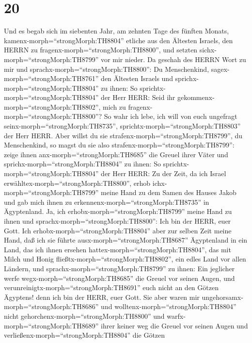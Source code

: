 \hypertarget{section-19}{%
\section{20}\label{section-19}}

 Und es begab sich im siebenten Jahr, am zehnten Tage des
fünften Monats, kamenx-morph=``strongMorph:TH8804'' etliche aus den
Ältesten Israels, den HERRN zu fragenx-morph=``strongMorph:TH8800'', und
setzten sichx-morph=``strongMorph:TH8799'' vor mir nieder. 
Da geschah des HERRN Wort zu mir und
sprachx-morph=``strongMorph:TH8800'':  Du Menschenkind,
sagex-morph=``strongMorph:TH8761'' den Ältesten Israels und
sprichx-morph=``strongMorph:TH8804'' zu ihnen: So
sprichtx-morph=``strongMorph:TH8804'' der Herr HERR: Seid ihr
gekommenx-morph=``strongMorph:TH8802'', mich zu
fragenx-morph=``strongMorph:TH8800''? So wahr ich lebe, ich will von
euch ungefragt seinx-morph=``strongMorph:TH8735'',
sprichtx-morph=``strongMorph:TH8803'' der Herr HERR.  Aber
willst du sie strafenx-morph=``strongMorph:TH8799'', du Menschenkind, so
magst du sie also strafenx-morph=``strongMorph:TH8799'': zeige ihnen
anx-morph=``strongMorph:TH8685'' die Greuel ihrer Väter  und
sprichx-morph=``strongMorph:TH8804'' zu ihnen: So
sprichtx-morph=``strongMorph:TH8804'' der Herr HERR: Zu der Zeit, da ich
Israel erwähltex-morph=``strongMorph:TH8800'', erhob
ichx-morph=``strongMorph:TH8799'' meine Hand zu dem Samen des Hauses
Jakob und gab mich ihnen zu erkennenx-morph=``strongMorph:TH8735'' in
Ägyptenland. Ja, ich erhobx-morph=``strongMorph:TH8799'' meine Hand zu
ihnen und sprachx-morph=``strongMorph:TH8800'': Ich bin der HERR, euer
Gott.  Ich erhobx-morph=``strongMorph:TH8804'' aber zur
selben Zeit meine Hand, daß ich sie führte
ausx-morph=``strongMorph:TH8687'' Ägyptenland in ein Land, das ich ihnen
ersehen hattex-morph=``strongMorph:TH8804'', das mit Milch und Honig
fließtx-morph=``strongMorph:TH8802'', ein edles Land vor allen Ländern,
 und sprachx-morph=``strongMorph:TH8799'' zu ihnen: Ein
jeglicher werfe wegx-morph=``strongMorph:TH8685'' die Greuel vor seinen
Augen, und verunreinigtx-morph=``strongMorph:TH8691'' euch nicht an den
Götzen Ägyptens! denn ich bin der HERR, euer Gott.  Sie aber
waren mir ungehorsamx-morph=``strongMorph:TH8686'' und
wolltenx-morph=``strongMorph:TH8804'' nicht
gehorchenx-morph=``strongMorph:TH8800'' und
warfx-morph=``strongMorph:TH8689'' ihrer keiner weg die Greuel vor
seinen Augen und verließenx-morph=``strongMorph:TH8804'' die Götzen
